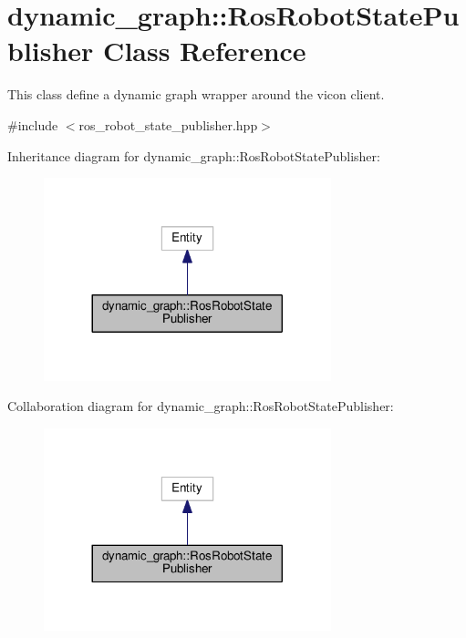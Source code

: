 \hypertarget{classdynamic__graph_1_1RosRobotStatePublisher}{}\section{dynamic\+\_\+graph\+:\+:Ros\+Robot\+State\+Publisher Class Reference}
\label{classdynamic__graph_1_1RosRobotStatePublisher}


This class define a dynamic graph wrapper around the vicon client.  




{\ttfamily \#include $<$ros\+\_\+robot\+\_\+state\+\_\+publisher.\+hpp$>$}



Inheritance diagram for dynamic\+\_\+graph\+:\+:Ros\+Robot\+State\+Publisher\+:
\nopagebreak
\begin{figure}[H]
\begin{center}
\leavevmode
\includegraphics[width=236pt]{classdynamic__graph_1_1RosRobotStatePublisher__inherit__graph}
\end{center}
\end{figure}


Collaboration diagram for dynamic\+\_\+graph\+:\+:Ros\+Robot\+State\+Publisher\+:
\nopagebreak
\begin{figure}[H]
\begin{center}
\leavevmode
\includegraphics[width=236pt]{classdynamic__graph_1_1RosRobotStatePublisher__coll__graph}
\end{center}
\end{figure}
